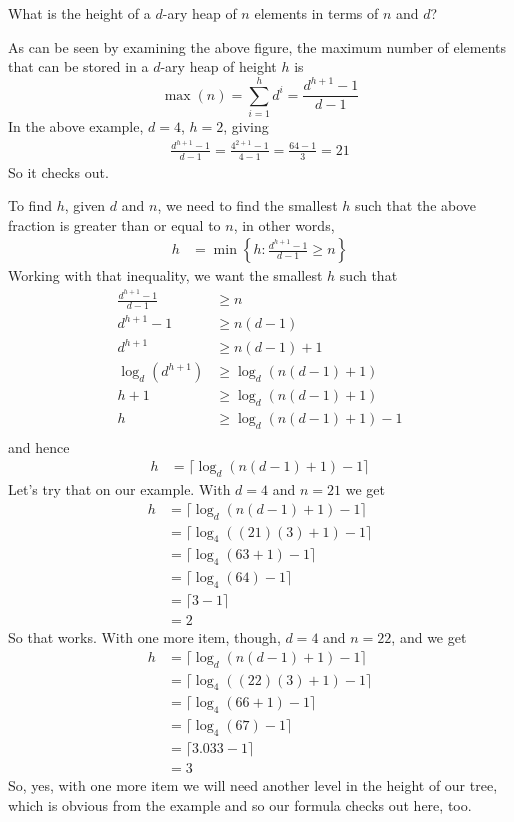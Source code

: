 \documentclass{article}
\begin{document}
\begin{description}
\begin{itemize}
   \end{itemize}
   
   \item What is the height of a $d$-ary heap of $n$ elements in terms
     of $n$ and $d$?

     As can be seen by examining the above figure, the maximum number
     of elements that can be stored in a $d$-ary heap of height $h$ is
     \[
\max(n) =  \sum_{i=1}^{h}d^i = \frac{d^{h+1}-1}{d-1}
     \]
     In the above example, $d=4$, $h=2$, giving
     \begin{align*}
       \frac{d^{h+1}-1}{d-1} =  \frac{4^{2+1}-1}{4-1}
       = \frac{64-1}{3}
       = 21
     \end{align*}
     So it checks out.


To find $h$, given $d$ and $n$, we need to find the smallest $h$ such
that the above fraction is greater than or equal to $n$, in other
words,
\begin{align*}
  h &= \min\left\{h : \frac{d^{h+1}-1}{d-1} \geq n\right\}
  \end{align*}
Working with that inequality, we want the smallest $h$ such that
\begin{align*}
   \frac{d^{h+1}-1}{d-1} &\geq n\\
   d^{h+1}-1 &\geq n(d-1)\\
   d^{h+1} &\geq n(d-1) + 1\\
\log_d(   d^{h+1}) &\geq \log_d (n(d -1) + 1)\\
  h+1 &\geq \log_d (n(d-1) + 1)\\
  h &\geq \log_d (n(d -1) + 1)-1\\
\end{align*}
and hence
\begin{align*}
  h &= \lceil\log_d (n(d -1) + 1)-1\rceil
\end{align*}
Let's try that on our example.  With $d=4$ and $n=21$ we get
\begin{align*}
  h &= \lceil\log_d (n(d -1) + 1)-1\rceil\\
   &= \lceil\log_4 ((21)(3)  + 1)-1\rceil\\
   &= \lceil\log_4 (63  + 1)-1\rceil\\
   &= \lceil\log_4 (64)-1\rceil\\
   &= \lceil3-1\rceil\\
   &= 2
\end{align*}
So that works.  With one more item, though, $d=4$ and $n=22$, and we get
\begin{align*}
  h &= \lceil\log_d (n(d -1) + 1)-1\rceil\\
   &= \lceil\log_4 ((22)(3)  + 1)-1\rceil\\
   &= \lceil\log_4 (66  + 1)-1\rceil\\
   &= \lceil\log_4 (67)-1\rceil\\
   &= \lceil3.033-1\rceil\\
   &= 3
\end{align*}
So, yes, with one more item we will need another level in the height
of our tree, which is obvious from the example and so our formula
checks out here, too.





\end{description}
\end{document}
